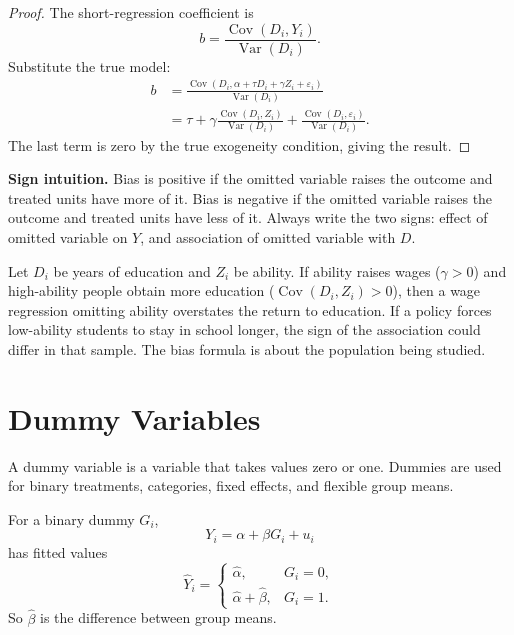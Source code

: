 \begin{proof}
The short-regression coefficient is
\[
  b=\frac{\operatorname{Cov}(D_i,Y_i)}{\operatorname{Var}(D_i)}.
\]
Substitute the true model:
\[
\begin{aligned}
  b
  &=\frac{\operatorname{Cov}(D_i,\alpha+\tau D_i+\gamma Z_i+\varepsilon_i)}
          {\operatorname{Var}(D_i)} \\
  &=\tau+\gamma
      \frac{\operatorname{Cov}(D_i,Z_i)}{\operatorname{Var}(D_i)}
      +\frac{\operatorname{Cov}(D_i,\varepsilon_i)}{\operatorname{Var}(D_i)}.
\end{aligned}
\]
The last term is zero by the true exogeneity condition, giving the result.
\end{proof}

\begin{boxF}
\textbf{Sign intuition.} Bias is positive if the omitted variable raises the
outcome and treated units have more of it. Bias is negative if the omitted
variable raises the outcome and treated units have less of it. Always write
the two signs: effect of omitted variable on $Y$, and association of omitted
variable with $D$.
\end{boxF}

\begin{exmp}
Let $D_i$ be years of education and $Z_i$ be ability. If ability raises wages
($\gamma>0$) and high-ability people obtain more education
($\operatorname{Cov}(D_i,Z_i)>0$), then a wage regression omitting ability
overstates the return to education. If a policy forces low-ability students to
stay in school longer, the sign of the association could differ in that sample.
The bias formula is about the population being studied.
\end{exmp}

\section{Dummy Variables}

A dummy variable is a variable that takes values zero or one. Dummies are used
for binary treatments, categories, fixed effects, and flexible group means.

For a binary dummy $G_i$,
\[
  Y_i=\alpha+\beta G_i+u_i
\]
has fitted values
\[
  \hat Y_i =
  \begin{cases}
    \hat\alpha, & G_i=0,\\
    \hat\alpha+\hat\beta, & G_i=1.
  \end{cases}
\]
So $\hat\beta$ is the difference between group means.

